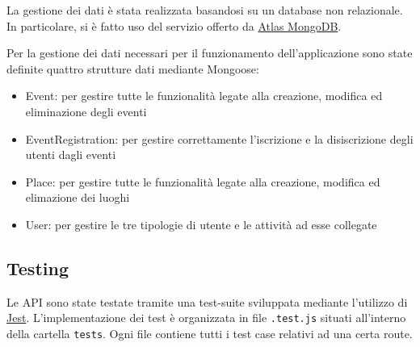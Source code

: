 \documentclass[9pt]{extarticle}
\begin{document}
La gestione dei dati è stata realizzata basandosi su un database non
relazionale. In particolare, si è fatto uso del servizio offerto da
\href{https://www.mongodb.com/products/platform/atlas-database}{Atlas MongoDB}.

Per la gestione dei dati necessari per il funzionamento dell'applicazione sono state definite quattro strutture dati mediante Mongoose:
\begin{itemize}
	\item Event: per gestire tutte le funzionalità legate alla creazione, modifica ed eliminazione degli eventi
	\item EventRegistration: per gestire correttamente l'iscrizione e la disiscrizione degli utenti dagli eventi
	\item Place: per gestire tutte le funzionalità legate alla creazione, modifica ed elimazione dei luoghi
	\item User: per gestire le tre tipologie di utente e le attività ad esse collegate
\end{itemize}

\newpage
\subsection{Testing}

Le API sono state testate tramite una test-suite sviluppata mediante l'utilizzo di \href{https://jestjs.io/}{Jest}. L’implementazione dei test è organizzata in file \verb|.test.js| situati all'interno della cartella \verb*|tests|. Ogni file contiene tutti i test case relativi ad una certa route.
\end{document}
